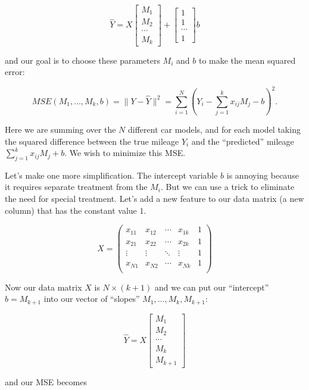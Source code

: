 \documentclass[
  11pt,
  letterpaper,
]{scrbook}
\theoremstyle{plain}
\theoremstyle{remark}
\begin{document}
\[
\hat{Y} = X\left[\begin{matrix} M_1 \\ M_2 \\ \cdots \\
M_k\end{matrix}\right]+\left[\begin{matrix} 1 \\ 1 \\ \cdots \\
1\end{matrix}\right]b
\]

and our goal is to choose these parameters \(M_i\) and \(b\) to make the
mean squared error:

\[
MSE(M_1,\ldots, M_k,b) = \|Y-\hat{Y}\|^2 = \sum_{i=1}^{N} (Y_i -
\sum_{j=1}^{k} x_{ij}M_j -b )^2.
\]

Here we are summing over the \(N\) different car models, and for each
model taking the squared difference between the true mileage \(Y_i\) and
the ``predicted'' mileage \(\sum_{j=1}^{k} x_{ij}M_j +b\). We wish to
minimize this MSE.

Let's make one more simplification. The intercept variable \(b\) is
annoying because it requires separate treatment from the \(M_i\). But we
can use a trick to eliminate the need for special treatment. Let's add a
new feature to our data matrix (a new column) that has the constant
value \(1\).

\[
X = \left(\begin{matrix} x_{11} & x_{12} & \cdots & x_{1k} & 1\\
x_{21} & x_{22} & \cdots & x_{2k} & 1\\ \vdots & \vdots & \ddots &
\vdots & 1\\ x_{N1} & x_{N2} & \cdots & x_{Nk} & 1\\
\end{matrix}\right)
\]

Now our data matrix \(X\) is \(N\times(k+1)\) and we can put our
``intercept'' \(b=M_{k+1}\) into our vector of ``slopes''
\(M_1, \ldots, M_k,M_{k+1}\):

\[
\hat{Y} = X\left[\begin{matrix} M_1 \\ M_2 \\ \cdots \\ M_k \\
M_{k+1}\end{matrix}\right]
\]

and our MSE becomes
\end{document}
